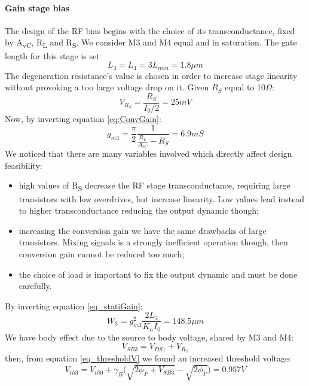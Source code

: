 \paragraph{Gain stage bias}
The design of the RF bias begins with the choice of its transconductance, fixed by A\textsubscript{vC}, R\textsubscript{L} and R\textsubscript{S}. We consider M3 and M4 equal and in saturation. The gate length for this stage is set
\begin{equation}
	L_3 = L_4 = 3 L_{min} = 1.8 \mu m
\end{equation} 
The  degeneration resistance's value is chosen in order to increase stage linearity without provoking a too large voltage drop on it. Given $R_S$ equal to 10$\Omega$:
\begin{equation}
V_{R_S}=\frac{R_S}{I_0/2} = 25 mV
\end{equation}
Now, by inverting equation \ref{eq:ConvGain}:
\begin{equation}
	g_{m3} = \frac{\pi}{2}\frac{1}{\frac{R_L}{A_{vC}}-R_S}=6.9 mS
\end{equation}
We noticed that there are many variables involved which directly affect design feasibility:
\begin{itemize}
	\item high values of R\textsubscript{S} decrease the RF stage transconductance, requiring large transistors with low overdrives, but increase linearity. Low values lead instead to higher transconductance reducing the output dynamic though;
	\item increasing the conversion gain we have the same drawbacks of large transistors. Mixing signals is a strongly inefficient operation though, then conversion gain cannot be reduced too much;
	\item the choice of load is important to fix the output dynamic and must be done carefully.
\end{itemize}
By inverting equation \ref{eq_statiGain}:
\begin{equation}
W_3 = g_{m3}^2\frac{2L_{3}}{K_nI_0} = 148.5 \mu m
\end{equation}
We have body effect due to the source to body voltage, shared by M3 and M4:
\begin{equation}
	V_{SB3} = V_{DS1}+V_{R_S}
\end{equation} 
then, from equation \ref{eq_thresholdV} we found an increased threshold voltage:
\begin{equation}
	V_{th3} = V_{th0}+\gamma_B\big(\sqrt{2\phi_P + V_{SB3}}-\sqrt{2\phi_P}\big) = 0.957 V 
\end{equation}
